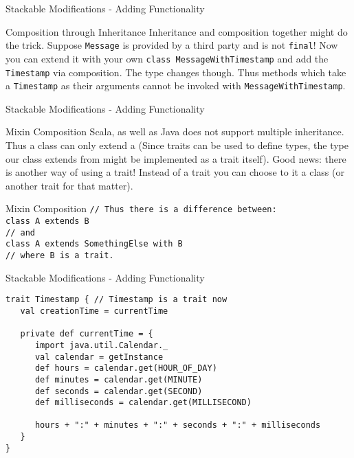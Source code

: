 \begin{frame}[fragile]{Stackable Modifications - Adding Functionality}
\begin{block}{Composition through Inheritance}
Inheritance and composition together might do the trick. Suppose
\lstinline!Message! is provided by a third party and is not \lstinline!final!!
Now you can extend it with your own \lstinline!class MessageWithTimestamp! and
add the \lstinline!Timestamp! via composition. \alert{The type changes though}.
Thus methods which take a \lstinline!Timestamp! as their arguments cannot be
invoked with \lstinline!MessageWithTimestamp!.
\end{block}
\end{frame}

\begin{frame}[fragile]{Stackable Modifications - Adding Functionality}
\begin{block}{Mixin Composition}
Scala, as well as Java \alert{does not support multiple inheritance}. Thus a
class can only extend a  (Since traits can be
used to define types, the type our class extends from might be implemented as a trait itself).
Good news: there is another way of using a trait! Instead of
 a trait you can choose to  it
 a class (or another trait for that matter).
\end{block}
\pause
\begin{block}{Mixin Composition}
\lstinline!// Thus there is a difference between:!\\
\lstinline!class A extends B!\\
\lstinline!// and!\\
\lstinline!class A extends SomethingElse with B!\\
\lstinline!// where B is a trait.!
\end{block}
\end{frame}

\begin{frame}[fragile]{Stackable Modifications - Adding Functionality}
\begin{lstlisting}
trait Timestamp { // Timestamp is a trait now
   val creationTime = currentTime
   
   private def currentTime = {
      import java.util.Calendar._
      val calendar = getInstance
      def hours = calendar.get(HOUR_OF_DAY)
      def minutes = calendar.get(MINUTE)
      def seconds = calendar.get(SECOND)
      def milliseconds = calendar.get(MILLISECOND)
      
      hours + ":" + minutes + ":" + seconds + ":" + milliseconds
   }
}
\end{lstlisting}
\end{frame}

